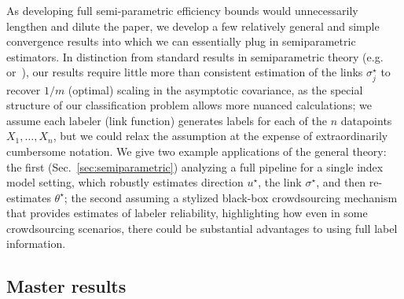 \documentclass[11pt]{article}
\newcommand{\<}{\langle} %
\renewcommand{\>}{\rangle}
\newcommand{\opt}{^\star}
\begin{document}
As developing full semi-parametric efficiency bounds would unnecessarily
lengthen and dilute the paper, we develop a few relatively general and
simple convergence results into which we can essentially plug in
semiparametric estimators. In distinction from standard results in
semiparametric theory (e.g.~\cite[Ch.~25]{VanDerVaart98}
or~\cite{BickelKlRiWe98}), our results require little more than consistent
estimation of the links $\sigma_j\opt$ to recover $1/m$ (optimal) scaling in
the asymptotic covariance, as the special structure of our classification
problem allows more nuanced calculations; we assume each labeler (link
function) generates labels for each of the $n$ datapoints $X_1, \ldots,
X_n$, but we could relax the assumption at the expense of extraordinarily
cumbersome notation.  We give two example applications of the general
theory: the first (Sec.~\ref{sec:semiparametric}) analyzing a full pipeline
for a single index model setting, which robustly estimates direction $u\opt$,
the link $\sigma\opt$, and then re-estimates $\theta\opt$; the second
assuming a stylized black-box crowdsourcing mechanism that provides
estimates of labeler reliability, highlighting how even in some
crowdsourcing scenarios, there could be substantial advantages to using full
label information.

\subsection{Master results}
\label{sec:master-results-sem}
\end{document}
